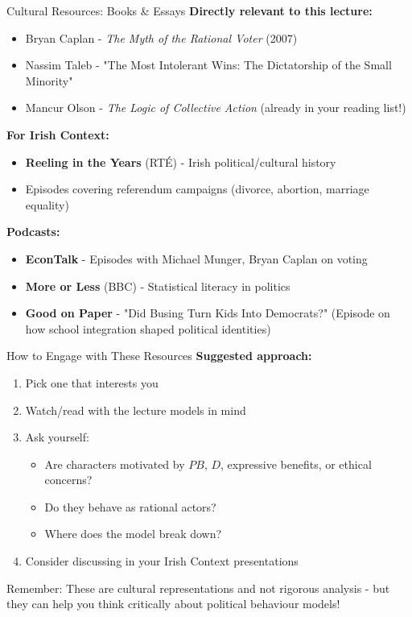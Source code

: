 \documentclass[10pt]{beamer}
\begin{document}
\begin{frame}{Cultural Resources: Books \& Essays}
\textbf{Directly relevant to this lecture:}
\begin{itemize}
\item Bryan Caplan - \emph{The Myth of the Rational Voter} (2007)
\item Nassim Taleb - "The Most Intolerant Wins: The Dictatorship of the Small Minority"
\item Mancur Olson - \emph{The Logic of Collective Action} (already in your reading list!)
\end{itemize}



\textbf{For Irish Context:}
\begin{itemize}
\item \textbf{Reeling in the Years} (RTÉ) - Irish political/cultural history
\item Episodes covering referendum campaigns (divorce, abortion, marriage equality)
\end{itemize}



\textbf{Podcasts:}
\begin{itemize}
\item \textbf{EconTalk} - Episodes with Michael Munger, Bryan Caplan on voting
\item \textbf{More or Less} (BBC) - Statistical literacy in politics
\item \textbf{Good on Paper} - "Did Busing Turn Kids Into Democrats?" (Episode on how school integration shaped political identities)
\end{itemize}
\end{frame}

\begin{frame}{How to Engage with These Resources}
\textbf{Suggested approach:}
\begin{enumerate}
\item Pick one that interests you
\item Watch/read with the lecture models in mind
\item Ask yourself:
\begin{itemize}
\item Are characters motivated by $PB$, $D$, expressive benefits, or ethical concerns?
\item Do they behave as rational actors?
\item Where does the model break down?
\end{itemize}
\item Consider discussing in your Irish Context presentations
\end{enumerate}



\alert{Remember:} These are cultural representations and not rigorous analysis - but they can help you think critically about political behaviour models!
\end{frame}
\end{document}
